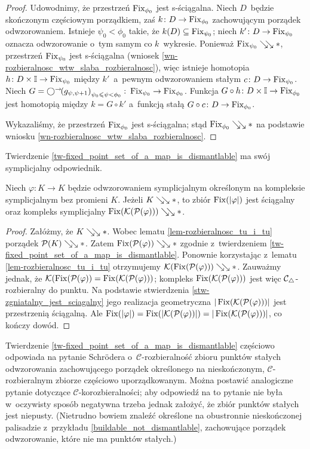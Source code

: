 \begin{proof}
Udowodnimy, że przestrzeń $\operatorname{Fix}_{\phi_0}$ jest s-ściągalna. Niech $D$~będzie skończonym częściowym porządkiem, zaś $k\colon D\to \operatorname{Fix}_{\phi_0}$ zachowującym porządek odwzorowaniem. Istnieje $\psi_0<\phi_0$ takie, że $k(D)\subseteq \operatorname{Fix}_{\psi_0}$; niech $k'\colon D\to \operatorname{Fix}_{\psi_0}$ oznacza odwzorowanie o~tym samym co $k$~wykresie. Ponieważ \mbox{$\operatorname{Fix}_{\psi_0}\searrow\!\!\searrow *$}, przestrzeń $\operatorname{Fix}_{\psi_0}$ jest s-ściągalna (wniosek \ref{wn-rozbieralnosc_wtw_slaba_rozbieralnosc}), więc istnieje homotopia \mbox{$h\colon D\times \mathbb{I}\to \operatorname{Fix}_{\psi_0}$} między $k'$~a~pewnym odwzorowaniem stałym $c\colon D\to \operatorname{Fix}_{\psi_0}$. Niech $G=\bigcirc^\rightarrow\!\!\left(g_{\psi,\psi+1}\right)_{\psi_0\leqslant\psi<\phi_0}\colon \operatorname{Fix}_{\psi_0}\to \operatorname{Fix}_{\phi_0}$. Funkcja $G\circ h\colon D\times \mathbb{I}\to \operatorname{Fix}_{\phi_0}$ jest homotopią między $k=G\circ k'$ a~funkcją stałą $G\circ c\colon D\to \operatorname{Fix}_{\phi_0}$.

Wykazaliśmy, że przestrzeń $\operatorname{Fix}_{\phi_0}$ jest s-ściągalna; stąd $\operatorname{Fix}_{\phi_0}\searrow\!\!\searrow *$ na podstawie wniosku \ref{wn-rozbieralnosc_wtw_slaba_rozbieralnosc}.
\end{proof}

Twierdzenie \ref{tw-fixed_point_set_of_a_map_is_dismantlable} ma swój symplicjalny odpowiednik.

\begin{wn}
Niech $\varphi\colon K\to K$ będzie odwzorowaniem symplicjalnym określonym na kompleksie symplicjalnym bez promieni $K$. Jeżeli $K\searrow\!\!\searrow *$, to zbiór $\operatorname{Fix}(|\varphi|)$ jest ściągalny oraz kompleks symplicjalny $\operatorname{Fix}(\mathcal{K}(\mathcal{P}(\varphi)))\searrow\!\!\searrow *$.
\end{wn}
\begin{proof}
Załóżmy, że $K\searrow\!\!\searrow *$. Wobec lematu \ref{lem-rozbieralnosc_tu_i_tu} porządek $\mathcal{P}(K)\searrow\!\!\searrow *$. Zatem $\operatorname{Fix}(\mathcal{P}(\varphi))\searrow\!\!\searrow *$ zgodnie z~twierdzeniem \ref{tw-fixed_point_set_of_a_map_is_dismantlable}. Ponownie korzystając z~lematu \ref{lem-rozbieralnosc_tu_i_tu} otrzymujemy $\mathcal{K}(\operatorname{Fix}(\mathcal{P}(\varphi)))\searrow\!\!\searrow *$. Zauważmy jednak, że $\mathcal{K}(\operatorname{Fix}(\mathcal{P}(\varphi))=\operatorname{Fix}(\mathcal{K}(\mathcal{P}(\varphi)))$; kompleks $\operatorname{Fix}(\mathcal{K}(\mathcal{P}(\varphi)))$ jest więc \mbox{$\mathcal{C}_\triangle$-rozbieralny} do punktu. Na podstawie stwierdzenia \ref{stw-zgniatalny_jest_sciagalny} jego realizacja geometryczna $|\operatorname{Fix}(\mathcal{K}(\mathcal{P}(\varphi)))|$ jest przestrzenią ściągalną. Ale $\operatorname{Fix}(|\varphi|)=\operatorname{Fix}(|\mathcal{K}(\mathcal{P}(\varphi))|)=|\operatorname{Fix}(\mathcal{K}(\mathcal{P}(\varphi)))|$, co kończy dowód.
\end{proof}

Twierdzenie \ref{tw-fixed_point_set_of_a_map_is_dismantlable} częściowo odpowiada na pytanie Schr{\"o}dera \cite[s.~136]{Schroder03} o~\mbox{$\mathcal{C}$-rozbieralność} zbioru punktów stałych odwzorowania zachowującego porządek określonego na nieskończonym, \mbox{$\mathcal{C}$-rozbieralnym} zbiorze częściowo uporządkowanym. Można postawić analogiczne pytanie dotyczące \mbox{$\mathcal{C}$-korozbieralności}; aby odpowiedź na to pytanie nie była w~oczywisty sposób negatywna trzeba jednak założyć, że zbiór punktów stałych jest niepusty. (Nietrudno bowiem znaleźć określone na obustronnie nieskończonej palisadzie z~przykładu \ref{buildable_not_dismantlable}, zachowujące porządek odwzorowanie, które nie ma punktów stałych.)

